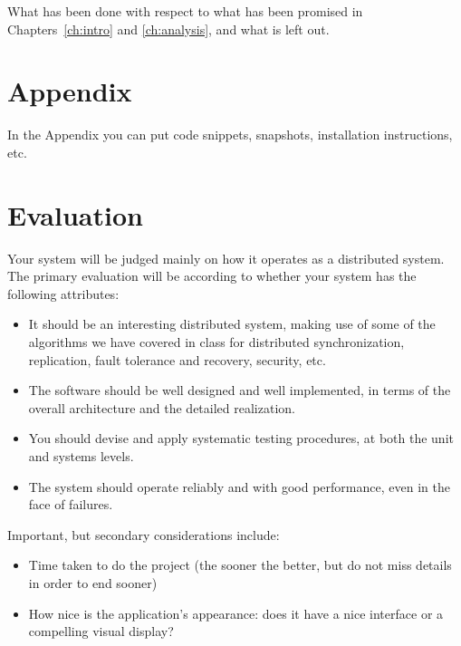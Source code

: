 \documentclass{memoir}
\begin{document}
What has been done with respect to what has been promised in Chapters~\ref{ch:intro} and \ref{ch:analysis}, and what is left out.

\appendix

\chapter{Appendix}

In the Appendix you can put code snippets, snapshots, installation instructions, etc.


\chapter*{Evaluation}
Your system will be judged mainly on how it operates as a distributed system. The primary evaluation will be according to whether your system has the following attributes:
\begin{itemize}
\item  It should be an interesting distributed system, making use of some of the algorithms we have covered in class for distributed synchronization, replication, fault tolerance and recovery, security, etc.
\item The software should be well designed and well implemented, in terms of the overall architecture and the detailed realization.
\item You should devise and apply systematic testing procedures, at both the unit and systems levels.
\item The system should operate reliably and with good performance, even in the face of failures.
\end{itemize}
Important, but secondary considerations include:
\begin{itemize}
\item Time taken to do the project (the sooner the better, but do not miss details in order to end sooner)
\item  How nice is the application's appearance: does it have a nice interface or a compelling visual display?
\end{itemize}
\end{document}
